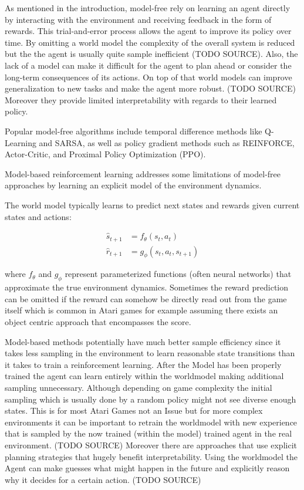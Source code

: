 \documentclass[
	english,
	ruledheaders=section,
	class=report,
	thesis={type=master},
	accentcolor=9c,
	custommargins=true,
	marginpar=false,
	parskip=half-,
	fontsize=11pt,
]{tudapub}
\begin{document}
As mentioned in the introduction, model-free rely on learning an agent directly
by interacting with the environment and receiving feedback in the form of
rewards. This trial-and-error process allows the agent to improve its policy
over time. By omitting a world model the complexity of the overall system is
reduced but the the agent is usually quite sample inefficient (TODO SOURCE).
Also, the lack of a model can make it difficult for the agent to plan ahead or
consider the long-term consequences of its actions. On top of that world models
can improve generalization to new tasks and make the agent more robust. (TODO
SOURCE) Moreover they provide limited interpretability with regards to their
learned policy.

Popular model-free algorithms include temporal difference methods like
Q-Learning and SARSA, as well as policy gradient methods such as REINFORCE,
Actor-Critic, and Proximal Policy Optimization (PPO).

Model-based reinforcement learning addresses some limitations of model-free
approaches by learning an explicit model of the environment dynamics.

The world model typically learns to predict next states and rewards given
current states and actions:

\begin{align}
	\hat{s}_{t+1} & = f_\theta(s_t, a_t)        \\
	\hat{r}_{t+1} & = g_\phi(s_t, a_t, s_{t+1})
\end{align}

where $f_\theta$ and $g_\phi$ represent parameterized functions (often neural
networks) that approximate the true environment dynamics. Sometimes the reward
prediction can be omitted if the reward can somehow be directly read out from
the game itself which is common in Atari games for example assuming there
exists an object centric approach that encompasses the score.

Model-based methods potentially have much better sample efficiency since it
takes less sampling in the environment to learn reasonable state transitions
than it takes to train a reinforcement learning. After the Model has been
properly trained the agent can learn entirely within the worldmodel making
additional sampling unnecessary. Although depending on game complexity the
initial sampling which is usually done by a random policy might not see diverse
enough states. This is for most Atari Games not an Issue but for more complex
environments it can be important to retrain the worldmodel with new experience
that is sampled by the now trained (within the model) trained agent in the real
environment. (TODO SOURCE) Moreover there are approaches that use explicit
planning strategies that hugely benefit interpretability. Using the worldmodel
the Agent can make guesses what might happen in the future and explicitly
reason why it decides for a certain action. (TODO SOURCE)
\end{document}
